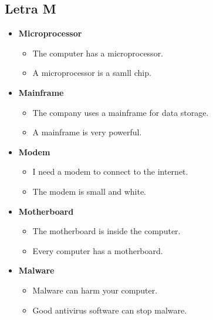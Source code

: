     \subsection{Letra M}
    \begin{itemize}
        \item \textbf{Microprocessor}
        \begin{itemize}
            \item The computer has a microprocessor.
            \item A microprocessor is a samll chip.
        \end{itemize}
        \item \textbf{Mainframe}
        \begin{itemize}
            \item The company uses a mainframe for data storage.
            \item A mainframe is very powerful.
        \end{itemize}
        \item \textbf{Modem}
        \begin{itemize}
            \item I need a modem to connect to the internet.
            \item The modem is small and white.
        \end{itemize}
        \item \textbf{Motherboard}
        \begin{itemize}
            \item The motherboard is inside the computer.
            \item Every computer has a motherboard.
        \end{itemize}
        \item \textbf{Malware}
        \begin{itemize}
            \item Malware can harm your computer.
            \item Good antivirus software can stop malware.
        \end{itemize}
    \end{itemize}
